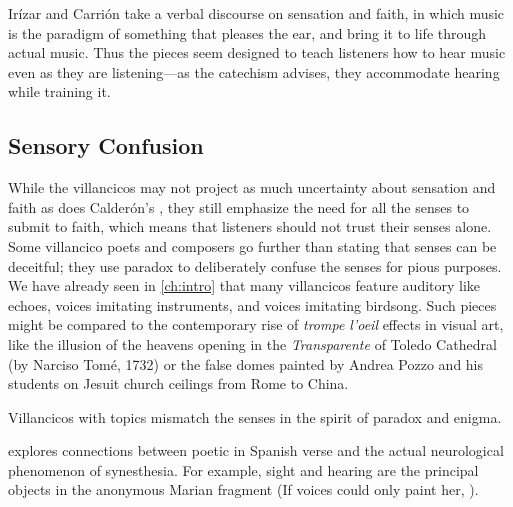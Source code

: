 Irízar and Carrión take a verbal discourse on sensation and faith, in which
music is the paradigm of something that pleases the ear, and bring it to life
through actual music.
Thus the pieces seem designed to teach listeners how to hear music even as they
are listening---as the catechism advises, they accommodate hearing while
training it.


\subsection{Sensory Confusion}

While the  villancicos may not project as much
uncertainty about sensation and faith as does Calderón's , they still emphasize the need for all the senses to submit
to faith, which means that listeners should not trust their senses alone.
Some villancico poets and composers go further than stating that senses can be
deceitful; they use paradox to deliberately confuse the senses for pious
purposes.
We have already seen in \cref{ch:intro} that many villancicos feature
auditory  like echoes, voices imitating instruments, and
voices imitating birdsong.
Such pieces might be compared to the contemporary rise of \emph{trompe l'oeil}
effects in visual art, like the illusion of the heavens opening in the
\emph{Transparente} of Toledo Cathedral (by Narciso Tomé, 1732) or the false
domes painted by Andrea Pozzo and his students on Jesuit church ceilings from
Rome to China.%
    \Autocites
    []{GroveArt}
    [110]{Bailey:Art}

Villancicos with  topics mismatch the senses in the spirit
of paradox and enigma.%
\begin{Footnote}
    \Autocite{DoetschKraus:Sinestesia} explores connections between poetic
     in Spanish verse and the actual
    neurological phenomenon of synesthesia.  
    For example, sight and hearing are the principal objects in the anonymous
    Marian fragment  (If voices
    could only paint her, ).
\end{Footnote}

